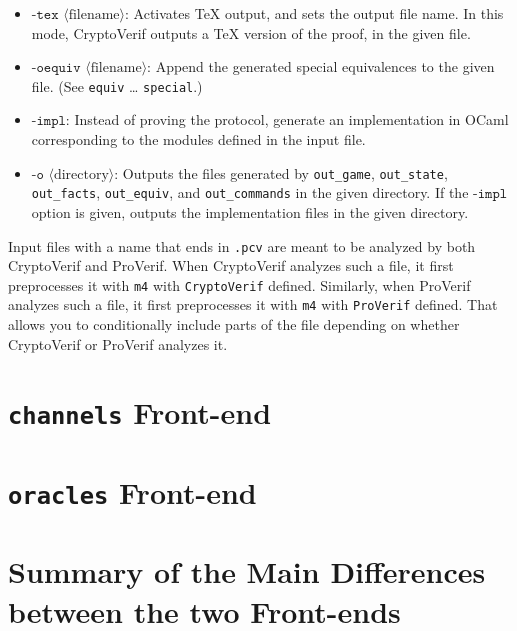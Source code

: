 \documentclass{article}
\newcommand{\nonterm}[1]{\langle\textrm{#1}\rangle}
\begin{document}
\begin{itemize}
\item $\texttt{-tex }\nonterm{filename}$: Activates TeX output, and sets
the output file name. In this mode, CryptoVerif outputs a TeX version
of the proof, in the given file.

\item $\texttt{-oequiv }\nonterm{filename}$: Append the generated 
special equivalences to the given file. (See \texttt{equiv} \dots 
\texttt{special}.)

\item $\texttt{-impl}$: Instead of proving the protocol, generate an
  implementation in OCaml corresponding to the modules defined in the input
  file.

\item $\texttt{-o }\nonterm{directory}$:
  Outputs the files generated by \texttt{out\_game}, \texttt{out\_state},
  \texttt{out\_facts}, \texttt{out\_equiv}, and \texttt{out\_commands} in the given directory.
  If the $\texttt{-impl}$ option
  is given, outputs the implementation files in the given directory.

\end{itemize}
Input files with a name that ends in \texttt{.pcv} are meant to
be analyzed by both CryptoVerif and ProVerif. When CryptoVerif
analyzes such a file, it first preprocesses it with \texttt{m4}
with \texttt{CryptoVerif} defined. Similarly, when ProVerif
analyzes such a file, it first preprocesses it with \texttt{m4}
with \texttt{ProVerif} defined. That allows you to conditionally
include parts of the file depending on whether CryptoVerif
or ProVerif analyzes it.

\newif\ifchannels

\section{\texttt{channels} Front-end}\label{sec:channels}

\channelstrue


\section{\texttt{oracles} Front-end}\label{sec:oracles}

\channelsfalse


\section{Summary of the Main Differences between the two Front-ends}
\end{document}
